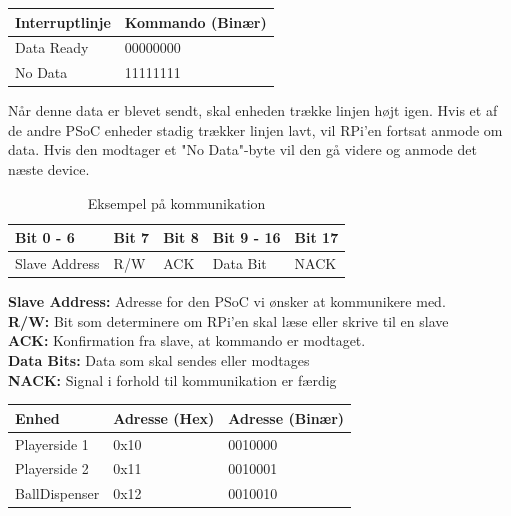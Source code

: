 \documentclass[Arkitektur/System_main.tex]{subfiles}
\begin{document}
\begin{table}[H]
\centering
\begin{tabular}{|l|l|}
\hline
\textbf{Interruptlinje} & \textbf{ Kommando (Binær)} \\ \hline
Data Ready & 00000000  \\ \hline
No Data & 11111111 \\ \hline
\end{tabular}
\end{table}
Når denne data er blevet sendt, skal enheden trække linjen højt igen. Hvis et af de andre PSoC enheder stadig trækker linjen lavt, vil RPi'en fortsat anmode om data. Hvis den modtager et "No Data"-byte vil den gå videre og anmode det næste device. 
\begin{table}[H]
    \centering
    \begin{tabular}{|L{0.2\textwidth}|L{0.15\textwidth}|L{0.15\textwidth}|L{0.15\textwidth}|L{0.15\textwidth}|}
\hline
\textbf{Bit 0 - 6} & \textbf{Bit 7} & \textbf{Bit 8} & \textbf{Bit 9 - 16}  & \textbf{Bit 17} \\ \hline
Slave Address & R/W & ACK & Data Bit & NACK \\ \hline
\end{tabular}
    \caption{Eksempel på kommunikation}
\end{table}

\textbf{Slave Address:} Adresse for den PSoC vi ønsker at kommunikere med. \\
\textbf{R/W:} Bit som determinere om RPi'en skal læse eller skrive til en slave \\
\textbf{ACK:} Konfirmation fra slave, at kommando er modtaget. \\
\textbf{Data Bits:} Data som skal sendes eller modtages\\
\textbf{NACK:} Signal i forhold til kommunikation er færdig \\

\begin{table}[H]
\centering
\begin{tabular}{|L{0.2\textwidth}|L{0.3\textwidth}|L{0.3\textwidth}|}
\hline
\textbf{Enhed} & \textbf{Adresse (Hex)} & \textbf{Adresse (Binær)} \\ \hline
Playerside 1 & 0x10 & 0010000 \\ \hline
Playerside 2 & 0x11 & 0010001 \\ \hline
BallDispenser & 0x12 & 0010010 \\ \hline
\end{tabular}
\end{table}
\end{document}
